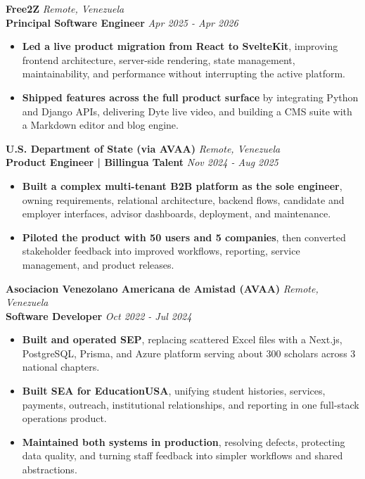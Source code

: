 \documentclass[10pt]{article}
\begin{document}
\vspace{2pt}
\textbf{Free2Z} \hfill \textit{Remote, Venezuela} \\
\textbf{Principal Software Engineer} \hfill \textit{Apr 2025 - Apr 2026}
\begin{itemize}
    \item \textbf{Led a live product migration from React to SvelteKit}, improving frontend architecture, server-side rendering, state management, maintainability, and performance without interrupting the active platform.
    \item \textbf{Shipped features across the full product surface} by integrating Python and Django APIs, delivering Dyte live video, and building a CMS suite with a Markdown editor and blog engine.
\end{itemize}

\vspace{2pt}
\textbf{U.S. Department of State (via AVAA)} \hfill \textit{Remote, Venezuela} \\
\textbf{Product Engineer | Billingua Talent} \hfill \textit{Nov 2024 - Aug 2025}
\begin{itemize}
    \item \textbf{Built a complex multi-tenant B2B platform as the sole engineer}, owning requirements, relational architecture, backend flows, candidate and employer interfaces, advisor dashboards, deployment, and maintenance.
    \item \textbf{Piloted the product with 50 users and 5 companies}, then converted stakeholder feedback into improved workflows, reporting, service management, and product releases.
\end{itemize}

\vspace{2pt}
\textbf{Asociacion Venezolano Americana de Amistad (AVAA)} \hfill \textit{Remote, Venezuela} \\
\textbf{Software Developer} \hfill \textit{Oct 2022 - Jul 2024}
\begin{itemize}
    \item \textbf{Built and operated SEP}, replacing scattered Excel files with a Next.js, PostgreSQL, Prisma, and Azure platform serving about 300 scholars across 3 national chapters.
    \item \textbf{Built SEA for EducationUSA}, unifying student histories, services, payments, outreach, institutional relationships, and reporting in one full-stack operations product.
    \item \textbf{Maintained both systems in production}, resolving defects, protecting data quality, and turning staff feedback into simpler workflows and shared abstractions.
\end{itemize}
\end{document}
